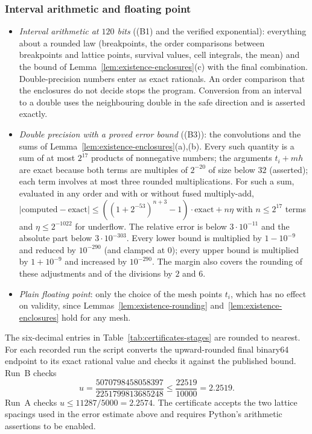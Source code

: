 \subsubsection*{Interval arithmetic and floating point}
\begin{itemize}
\item \emph{Interval arithmetic at $120$ bits} ((B1) and the verified exponential): everything
about a rounded law (breakpoints, the order comparisons between breakpoints and lattice
points, survival values, cell integrals, the mean) and the bound of
Lemma~\ref{lem:existence-enclosures}(c) with the final combination. Double-precision numbers enter
as exact rationals. An order comparison that the enclosures do not decide stops the program.
Conversion from an interval to a double uses the neighbouring double in the safe direction
and is asserted exactly.
\item \emph{Double precision with a proved error bound} ((B3)): the convolutions and the sums
of Lemma~\ref{lem:existence-enclosures}(a),(b). Every such quantity
is a sum of at most $2^{17}$ products of nonnegative numbers; the arguments $t_i+mh$ are exact
because both terms are multiples of $2^{-20}$ of size below $32$ (asserted); each term
involves at most three rounded multiplications. For such a sum, evaluated in any order and
with or without fused multiply-add,
$|\text{computed}-\text{exact}|\le((1+2^{-53})^{n+3}-1)\cdot\text{exact}+n\eta$ with
$n\le2^{17}$ terms and $\eta\le2^{-1022}$ for underflow. The relative error is below
$3\cdot10^{-11}$ and the absolute part below $3\cdot10^{-303}$. Every lower bound is
multiplied by $1-10^{-9}$ and reduced by $10^{-290}$ (and clamped at $0$); every upper bound
is multiplied by $1+10^{-9}$ and increased by $10^{-290}$. The margin also covers the
rounding of these adjustments and of the divisions by $2$ and $6$.
\item \emph{Plain floating point}: only the choice of the mesh points $t_i$, which has no
effect on validity, since Lemmas~\ref{lem:existence-rounding}
and~\ref{lem:existence-enclosures} hold for any mesh.
\end{itemize}

\begin{remark}\label{rem:certificates-digits}
The six-decimal entries in Table~\ref{tab:certificates-stages} are rounded to nearest.
For each recorded run the script converts the upward-rounded final binary64 endpoint to its
exact rational value and checks it against the published bound. Run~B checks
\[
u=\frac{5070798458058397}{2251799813685248}\le\frac{22519}{10000}=2.2519.
\]
Run~A checks $u\le11287/5000=2.2574$.
The certificate accepts the two lattice spacings used in the error estimate above and
requires Python's arithmetic assertions to be enabled.
\end{remark}

